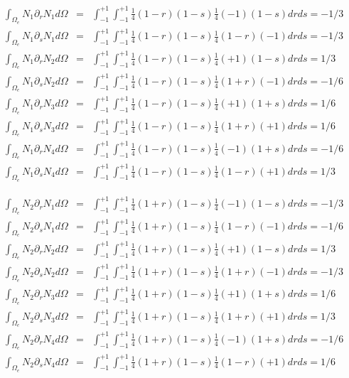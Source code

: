 \begin{tiny}

\begin{eqnarray}
\int_{\Omega_e}  N_1\partial_r N_1 d\Omega&=& \int_{-1}^{+1}\int_{-1}^{+1} \frac{1}{4}(1-r)(1-s) \frac{1}{4}(-1)(1-s) dr ds = -1/3 \\
\int_{\Omega_e}  N_1\partial_s N_1 d\Omega&=& \int_{-1}^{+1}\int_{-1}^{+1} \frac{1}{4}(1-r)(1-s) \frac{1}{4}(1-r)(-1) dr ds = -1/3 \\
\int_{\Omega_e}  N_1\partial_r N_2 d\Omega&=& \int_{-1}^{+1}\int_{-1}^{+1} \frac{1}{4}(1-r)(1-s) \frac{1}{4}(+1)(1-s) dr ds = 1/3 \\
\int_{\Omega_e}  N_1\partial_s N_2 d\Omega&=& \int_{-1}^{+1}\int_{-1}^{+1} \frac{1}{4}(1-r)(1-s) \frac{1}{4}(1+r)(-1) dr ds = -1/6 \\
\int_{\Omega_e}  N_1\partial_r N_3 d\Omega&=& \int_{-1}^{+1}\int_{-1}^{+1} \frac{1}{4}(1-r)(1-s) \frac{1}{4}(+1)(1+s) dr ds = 1/6 \\
\int_{\Omega_e}  N_1\partial_s N_3 d\Omega&=& \int_{-1}^{+1}\int_{-1}^{+1} \frac{1}{4}(1-r)(1-s) \frac{1}{4}(1+r)(+1) dr ds = 1/6 \\
\int_{\Omega_e}  N_1\partial_r N_4 d\Omega&=& \int_{-1}^{+1}\int_{-1}^{+1} \frac{1}{4}(1-r)(1-s) \frac{1}{4}(-1)(1+s) dr ds = -1/6 \\
\int_{\Omega_e}  N_1\partial_s N_4 d\Omega&=& \int_{-1}^{+1}\int_{-1}^{+1} \frac{1}{4}(1-r)(1-s) \frac{1}{4}(1-r)(+1) dr ds = 1/3 
\end{eqnarray}

\begin{eqnarray}
\int_{\Omega_e}  N_2\partial_r N_1 d\Omega&=& \int_{-1}^{+1}\int_{-1}^{+1} \frac{1}{4}(1+r)(1-s) \frac{1}{4}(-1)(1-s) dr ds = -1/3 \\
\int_{\Omega_e}  N_2\partial_s N_1 d\Omega&=& \int_{-1}^{+1}\int_{-1}^{+1} \frac{1}{4}(1+r)(1-s) \frac{1}{4}(1-r)(-1) dr ds = -1/6 \\
\int_{\Omega_e}  N_2\partial_r N_2 d\Omega&=& \int_{-1}^{+1}\int_{-1}^{+1} \frac{1}{4}(1+r)(1-s) \frac{1}{4}(+1)(1-s) dr ds = 1/3 \\
\int_{\Omega_e}  N_2\partial_s N_2 d\Omega&=& \int_{-1}^{+1}\int_{-1}^{+1} \frac{1}{4}(1+r)(1-s) \frac{1}{4}(1+r)(-1) dr ds = -1/3 \\
\int_{\Omega_e}  N_2\partial_r N_3 d\Omega&=& \int_{-1}^{+1}\int_{-1}^{+1} \frac{1}{4}(1+r)(1-s) \frac{1}{4}(+1)(1+s) dr ds = 1/6 \\
\int_{\Omega_e}  N_2\partial_s N_3 d\Omega&=& \int_{-1}^{+1}\int_{-1}^{+1} \frac{1}{4}(1+r)(1-s) \frac{1}{4}(1+r)(+1) dr ds = 1/3  \\
\int_{\Omega_e}  N_2\partial_r N_4 d\Omega&=& \int_{-1}^{+1}\int_{-1}^{+1} \frac{1}{4}(1+r)(1-s) \frac{1}{4}(-1)(1+s) dr ds = -1/6 \\
\int_{\Omega_e}  N_2\partial_s N_4 d\Omega&=& \int_{-1}^{+1}\int_{-1}^{+1} \frac{1}{4}(1+r)(1-s) \frac{1}{4}(1-r)(+1) dr ds = 1/6 
\end{eqnarray}



\end{tiny}
